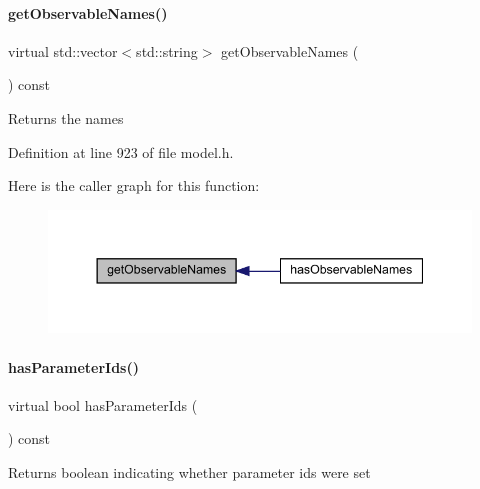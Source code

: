 \paragraph{\texorpdfstring{get\+Observable\+Names()}{getObservableNames()}}
{\footnotesize\ttfamily virtual std\+::vector$<$std\+::string$>$ get\+Observable\+Names (\begin{DoxyParamCaption}{ }\end{DoxyParamCaption}) const\hspace{0.3cm}{\ttfamily [virtual]}}

\begin{DoxyReturn}{Returns}
the names 
\end{DoxyReturn}


Definition at line 923 of file model.\+h.

Here is the caller graph for this function\+:
\nopagebreak
\begin{figure}[H]
\begin{center}
\leavevmode
\includegraphics[width=344pt]{classamici_1_1_model_a32b4a0c822a696e388aaa8284bf08059_icgraph}
\end{center}
\end{figure}
\mbox{\label{classamici_1_1_model_a216de46b6ca89c0bcc4f1c1418d2c06a}} 
\paragraph{\texorpdfstring{has\+Parameter\+Ids()}{hasParameterIds()}}
{\footnotesize\ttfamily virtual bool has\+Parameter\+Ids (\begin{DoxyParamCaption}{ }\end{DoxyParamCaption}) const\hspace{0.3cm}{\ttfamily [virtual]}}

\begin{DoxyReturn}{Returns}
boolean indicating whether parameter ids were set 
\end{DoxyReturn}


